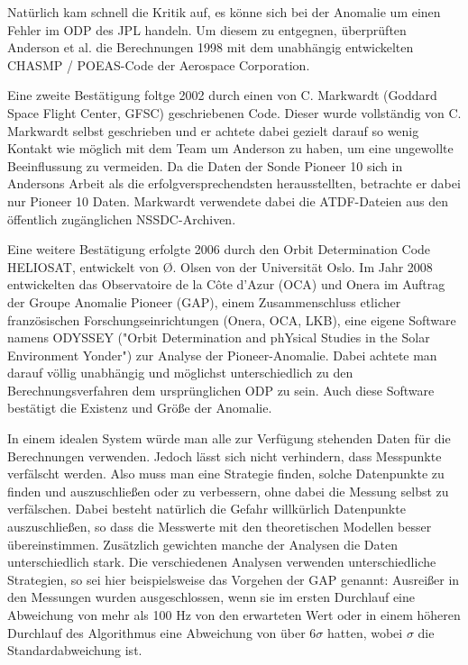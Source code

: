 Natürlich kam schnell die Kritik auf, es könne sich bei der Anomalie um einen Fehler im ODP des JPL handeln.
Um diesem zu entgegnen, überprüften Anderson et al. die Berechnungen 1998 mit dem unabhängig entwickelten CHASMP / POEAS-Code der Aerospace Corporation.

Eine zweite Bestätigung foltge 2002 durch einen von C. Markwardt (Goddard Space Flight Center, GFSC) geschriebenen
Code. Dieser wurde vollständig von C. Markwardt selbst geschrieben und er achtete dabei gezielt darauf so wenig Kontakt wie möglich mit dem Team um Anderson zu haben, um eine ungewollte Beeinflussung zu vermeiden\cite{Markwardt2002}. Da die Daten der Sonde Pioneer 10 sich in Andersons Arbeit als die erfolgversprechendsten herausstellten, betrachte er dabei nur Pioneer 10 Daten\cite{Markwardt2002}.
Markwardt verwendete dabei die ATDF-Dateien aus den öffentlich zugänglichen NSSDC-Archiven. %

Eine weitere Bestätigung erfolgte 2006 durch den Orbit Determination Code HELIOSAT, entwickelt von Ø. Olsen von der
Universität Oslo\cite{Olsen2006}.
Im Jahr 2008 entwickelten das Observatoire de la Côte d’Azur (OCA) und Onera im Auftrag der Groupe Anomalie Pioneer (GAP), einem Zusammenschluss etlicher französischen Forschungseinrichtungen (Onera, OCA, LKB),
eine eigene Software namens ODYSSEY ("Orbit Determination and phYsical Studies in the Solar Environment Yonder") zur Analyse der Pioneer-Anomalie.
Dabei achtete man darauf völlig unabhängig und möglichst unterschiedlich zu den Berechnungsverfahren dem ursprünglichen ODP zu sein. 
Auch diese Software bestätigt die Existenz und Größe der Anomalie\cite{Levy2008}.


In einem idealen System würde man alle zur Verfügung stehenden Daten für die Berechnungen verwenden. Jedoch lässt sich nicht verhindern, dass Messpunkte verfälscht werden. Also muss man eine Strategie finden, solche Datenpunkte zu finden und auszuschließen oder zu verbessern, ohne dabei die Messung selbst zu verfälschen. Dabei besteht natürlich die Gefahr willkürlich Datenpunkte auszuschließen, so dass die Messwerte mit den theoretischen Modellen besser übereinstimmen. Zusätzlich gewichten manche der Analysen die Daten unterschiedlich stark.
Die verschiedenen Analysen verwenden unterschiedliche Strategien, so sei hier beispielsweise das Vorgehen der GAP genannt:
Ausreißer in den Messungen wurden ausgeschlossen, wenn sie im ersten Durchlauf eine Abweichung von mehr als 100 Hz von den erwarteten Wert oder in einem höheren Durchlauf des Algorithmus eine Abweichung von über $6\sigma$ hatten, wobei $\sigma$ die Standardabweichung ist\cite{Levy2008}. %

